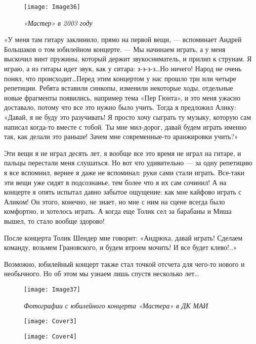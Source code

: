 \documentclass[16pt,a5paper,oneside]{book}
\begin{document}
\begin{figure}
    \centering
    \texttt{[image: Image36]}
    \caption{\textit{«Мастер» в 2003 году}}
\end{figure}

«У меня там гитару заклинило, прямо на первой вещи, — вспоминает Андрей Большаков о том юбилейном концерте. — Мы
начинаем играть, а у меня выскочил винт пружины, который держит звукосниматель, и прилип к струнам. Я играю, а из гитары
идет звук, как у ситара: з-з-з-з\ldots Но ничего! Народ не очень понял, что происходит\ldots Перед этим концертом у нас
прошло три или четыре репетиции. Ребята вставили синкопы, изменили некоторые ходы, отдельные новые фрагменты появились,
например тема «Пер Гюнта», и это меня ужасно доставало, потому что все это нужно было учить. Тогда я предложил Алику:
«Давай, я не буду это разучивать! Я просто хочу сыграть ту музыку, которую сам написал когда-то вместе с тобой. Ты мне
мил-дорог, давай будем играть именно так, как делали это раньше! Зачем мне современные-то аранжировки учить?»

Эти вещи я не играл десять лет, я вообще все это время не играл на гитаре, и пальцы перестали меня слушаться. Но вот что
удивительно — за одну репетицию я все вспомнил, вернее я даже не вспоминал: руки сами стали играть. Все-таки эти вещи
уже сидят в подсознанье, тем более что я их сам сочинил! А на концерте я опять испытал давно забытое ощущение: как мне
кайфово играть с Аликом! Он этого, конечно, не знает, но мне с ним на сцене всегда было комфортно, и хотелось играть. А
когда еще Толик сел за барабаны и Миша вышел, то стало вообще здорово!

После концерта Толик Шендер мне говорит: «Андрюха, давай играть! Сделаем команду, возьмем Грановского, и будем втроем
мочить! И все будет клево!..»

Возможно, юбилейный концерт также стал точкой отсчета для чего-то нового и необычного. Но об этом мы узнаем лишь спустя
несколько лет\ldots

\begin{figure}
    \centering
    \texttt{[image: Image37]}
    \caption{\textit{Фотографии с юбилейного концерта «Мастера» в ДК МАИ}}
\end{figure}

\begin{figure}
    \centering
    \texttt{[image: Cover3]}
\end{figure}

\begin{figure}
    \centering
    \texttt{[image: Cover4]}
\end{figure}
\end{document}
